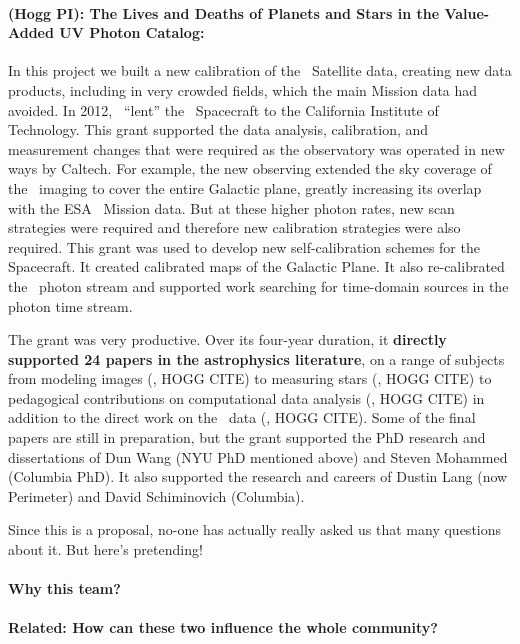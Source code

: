 \documentclass[12pt, letterpaper]{article}
\begin{document}
\paragraph{ (Hogg PI):
The Lives and Deaths of Planets and Stars in the Value-Added UV Photon Catalog:}
In this project we built a new calibration of the \GALEX\ Satellite
data, creating new data products, including in very crowded fields,
which the main Mission data had avoided.
In 2012, \NASA\ ``lent'' the \GALEX\ Spacecraft to the California Institute of Technology.
This grant supported the data analysis, calibration, and measurement
changes that were required as the observatory was operated in new
ways by Caltech.
For example, the new observing extended the sky coverage of the \GALEX\ imaging to
cover the entire Galactic plane, greatly increasing its overlap with
the ESA \Gaia\ Mission data.
But at these higher photon rates, new scan strategies were required and therefore
new calibration strategies were also required.
This grant was used to develop new self-calibration schemes for the Spacecraft.
It created calibrated maps of the Galactic Plane.
It also re-calibrated the \GALEX\ photon stream and supported work
searching for time-domain sources in the photon time stream.

The grant was very productive. Over its four-year duration, it
\textbf{directly supported 24 papers in the astrophysics literature}, on a
range of subjects from modeling images (\eg, HOGG CITE)
to measuring stars (\eg, HOGG CITE)
to pedagogical contributions on computational data analysis (\eg, HOGG CITE)
in addition to the direct work on the \GALEX\ data (\eg, HOGG CITE).
Some of the final papers are still in preparation, but the grant
supported the PhD research and dissertations of Dun Wang (NYU PhD
mentioned above) and Steven Mohammed (Columbia PhD).
It also supported the research and careers of Dustin Lang (now
Perimeter) and David Schiminovich (Columbia).


Since this is a proposal, no-one has actually really asked us that many questions
about it. But here's pretending!

\paragraph{Why this team?}

\paragraph{Related: How can these two influence the whole community?}
\end{document}
